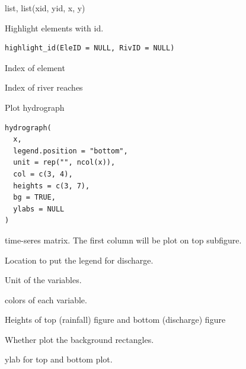 \documentclass[a4paper]{book}
\begin{document}
%
\begin{Value}
list, list(xid, yid, x, y)
\end{Value}
%
\begin{Description}\relax
Highlight elements with id.
\end{Description}
%
\begin{Usage}
\begin{verbatim}
highlight_id(EleID = NULL, RivID = NULL)
\end{verbatim}
\end{Usage}
%
\begin{Arguments}
\begin{ldescription}
\item[\code{EleID}] Index of element

\item[\code{RivID}] Index of river reaches
\end{ldescription}
\end{Arguments}
%
\begin{Description}\relax
Plot hydrograph
\end{Description}
%
\begin{Usage}
\begin{verbatim}
hydrograph(
  x,
  legend.position = "bottom",
  unit = rep("", ncol(x)),
  col = c(3, 4),
  heights = c(3, 7),
  bg = TRUE,
  ylabs = NULL
)
\end{verbatim}
\end{Usage}
%
\begin{Arguments}
\begin{ldescription}
\item[\code{x}] time-seres matrix. The first column will be plot on top subfigure.

\item[\code{legend.position}] Location to put the legend for discharge.

\item[\code{unit}] Unit of the variables.

\item[\code{col}] colors of each variable.

\item[\code{heights}] Heights of top (rainfall) figure and bottom (discharge) figure

\item[\code{bg}] Whether plot the background rectangles.

\item[\code{ylabs}] ylab for top and bottom plot.
\end{ldescription}
\end{Arguments}
\end{document}
